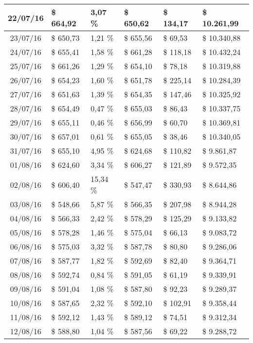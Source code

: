 \begin{small}
\begin{longtable}{|c|l|l|l|l|l|}
22/07/16 & \$ 664,92 & 3,07 \% & \$ 650,62 & \$ 134,17 & \$ 10.261,99 \\ \hline
23/07/16 & \$ 650,73 & 1,21 \% & \$ 655,56 & \$ 69,53 & \$ 10.340,88 \\ \hline
24/07/16 & \$ 655,41 & 1,58 \% & \$ 661,28 & \$ 118,18 & \$ 10.432,24 \\ \hline
25/07/16 & \$ 661,26 & 1,29 \% & \$ 654,10 & \$ 78,18 & \$ 10.319,88 \\ \hline
26/07/16 & \$ 654,23 & 1,60 \% & \$ 651,78 & \$ 225,14 & \$ 10.284,39 \\ \hline
27/07/16 & \$ 651,63 & 1,39 \% & \$ 654,35 & \$ 147,46 & \$ 10.325,92 \\ \hline
28/07/16 & \$ 654,49 & 0,47 \% & \$ 655,03 & \$ 86,43 & \$ 10.337,75 \\ \hline
29/07/16 & \$ 655,11 & 0,46 \% & \$ 656,99 & \$ 60,70 & \$ 10.369,81 \\ \hline
30/07/16 & \$ 657,01 & 0,61 \% & \$ 655,05 & \$ 38,46 & \$ 10.340,05 \\ \hline
31/07/16 & \$ 655,10 & 4,95 \% & \$ 624,68 & \$ 110,82 & \$ 9.861,87 \\ \hline
01/08/16 & \$ 624,60 & 3,34 \% & \$ 606,27 & \$ 121,89 & \$ 9.572,35 \\ \hline
02/08/16 & \$ 606,40 & 15,34 \% & \$ 547,47 & \$ 330,93 & \$ 8.644,86 \\ \hline
03/08/16 & \$ 548,66 & 5,87 \% & \$ 566,35 & \$ 207,98 & \$ 8.944,28 \\ \hline
04/08/16 & \$ 566,33 & 2,42 \% & \$ 578,29 & \$ 125,29 & \$ 9.133,82 \\ \hline
05/08/16 & \$ 578,28 & 1,46 \% & \$ 575,04 & \$ 66,13 & \$ 9.083,72 \\ \hline
06/08/16 & \$ 575,03 & 3,32 \% & \$ 587,78 & \$ 80,80 & \$ 9.286,06 \\ \hline
07/08/16 & \$ 587,77 & 1,82 \% & \$ 592,69 & \$ 82,40 & \$ 9.364,71 \\ \hline
08/08/16 & \$ 592,74 & 0,84 \% & \$ 591,05 & \$ 61,19 & \$ 9.339,91 \\ \hline
09/08/16 & \$ 591,04 & 1,08 \% & \$ 587,80 & \$ 92,23 & \$ 9.289,37 \\ \hline
10/08/16 & \$ 587,65 & 2,32 \% & \$ 592,10 & \$ 102,91 & \$ 9.358,44 \\ \hline
11/08/16 & \$ 592,12 & 1,43 \% & \$ 589,12 & \$ 74,51 & \$ 9.312,34 \\ \hline
12/08/16 & \$ 588,80 & 1,04 \% & \$ 587,56 & \$ 69,22 & \$ 9.288,72 \\ \hline

\end{longtable}
\end{small}
